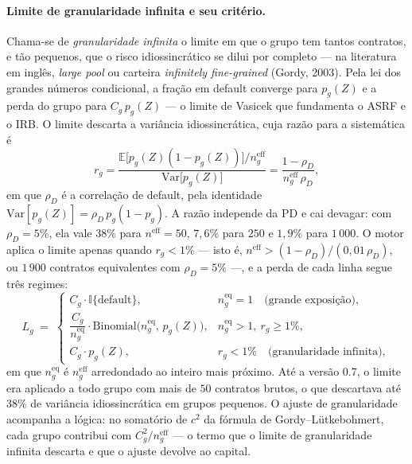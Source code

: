 \documentclass[11pt,a4paper]{article}
\newcommand{\E}{\mathbb{E}}
\newcommand{\Ind}{\mathbb{I}}
\begin{document}
\paragraph{Limite de granularidade infinita e seu critério.} Chama-se de \emph{granularidade infinita} o limite em que o grupo tem tantos contratos, e tão pequenos, que o risco idiossincrático se dilui por completo --- na literatura em inglês, \emph{large pool} ou carteira \emph{infinitely fine-grained} (Gordy, 2003). Pela lei dos grandes números condicional, a fração em default converge para $p_g(Z)$ e a perda do grupo para $C_g\,p_g(Z)$ --- o limite de Vasicek que fundamenta o ASRF e o IRB. O limite descarta a variância idiossincrática, cuja razão para a sistemática é
\begin{equation}
r_g=\frac{\E\bigl[p_g(Z)(1-p_g(Z))\bigr]/n_g^{\mathrm{eff}}}{\mathrm{Var}\bigl[p_g(Z)\bigr]}=\frac{1-\rho_D}{n_g^{\mathrm{eff}}\,\rho_D},
\label{eq:razao-lln}
\end{equation}
em que $\rho_D$ é a correlação de default, pela identidade $\mathrm{Var}[p_g(Z)]=\rho_D\,p_g(1-p_g)$. A razão independe da PD e cai devagar: com $\rho_D=5\%$, ela vale $38\%$ para $n^{\mathrm{eff}}=50$, $7{,}6\%$ para $250$ e $1{,}9\%$ para $1\,000$. O motor aplica o limite apenas quando $r_g<1\%$ --- isto é, $n^{\mathrm{eff}}>(1-\rho_D)/(0{,}01\,\rho_D)$, ou $1\,900$ contratos equivalentes com $\rho_D=5\%$ ---, e a perda de cada linha segue três regimes:
\begin{equation}
L_g \;=\;
\begin{cases}
C_g\cdot\Ind\{\text{default}\}, & n_g^{\mathrm{eq}}=1 \quad\text{(grande exposição)},\\[2pt]
\dfrac{C_g}{n_g^{\mathrm{eq}}}\cdot\mathrm{Binomial}\bigl(n_g^{\mathrm{eq}},\,p_g(Z)\bigr), & n_g^{\mathrm{eq}}>1,\ r_g\ge1\%,\\[6pt]
C_g\cdot p_g(Z), & r_g<1\% \quad\text{(granularidade infinita)},
\end{cases}
\label{eq:pooled}
\end{equation}
em que $n_g^{\mathrm{eq}}$ é $n_g^{\mathrm{eff}}$ arredondado ao inteiro mais próximo. Até a versão 0.7, o limite era aplicado a todo grupo com mais de $50$ contratos brutos, o que descartava até $38\%$ de variância idiossincrática em grupos pequenos. O ajuste de granularidade acompanha a lógica: no somatório de $c^2$ da fórmula de Gordy--Lütkebohmert, cada grupo contribui com $C_g^2/n_g^{\mathrm{eff}}$ --- o termo que o limite de granularidade infinita descarta e que o ajuste devolve ao capital.
\end{document}

